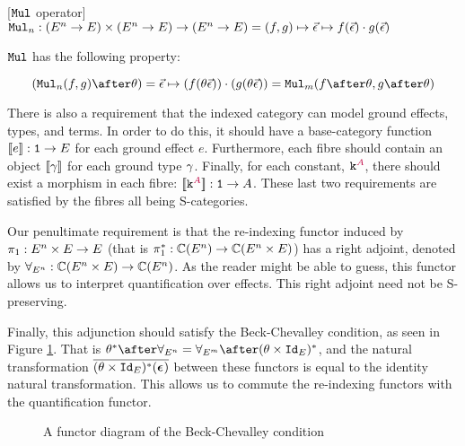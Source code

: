 \documentclass{Report}
\begin{document}
\begin{framed}
    \begin{definition}\label{MulDef}
        [$\texttt{Mul}$ operator]
        $\texttt{Mul}_n: (E^n \rightarrow E)\times (E^n \rightarrow E) \rightarrow (E^n \rightarrow E) = (f, g)\mapsto \vec{\epsilon}\mapsto f(\vec{\epsilon})\cdot g(\vec{\epsilon})$
    \end{definition}
    
    \begin{definition}[Naturality]\label{MulNaturality}
        $\texttt{Mul}$ has the following property:

        \begin{equation*}
            (\Mul_n(f, g)\after \theta) = \ev\mapsto(f(\theta \ev))\dot(g(\theta\ev)) = \Mul_m(f\after\theta, g\after\theta)
        \end{equation*}
    \end{definition}
\end{framed}

There is also a requirement that the indexed category can model ground effects, types, and terms. In order to do this, it should have a base-category function ${\bf [\![}e{\bf ]\!]}: \texttt{1}\rightarrow E$ for each ground effect $e$. Furthermore, each fibre should contain an object ${\bf [\![}\gamma{\bf ]\!]}$ for each ground type $\gamma$. Finally, for each constant, $\texttt{k}^{\color{purple} A}$, there should exist a morphism in each fibre: ${\bf [\![}\texttt{k}^{\color{purple} A}{\bf ]\!]}: \texttt{1} \rightarrow A$. These last two requirements are satisfied by the fibres all being S-categories.

Our penultimate requirement is that the re-indexing functor induced by $\pi_1: E^n\times E\rightarrow E$ (that is $\pi_1^*: \mathbb{C}(E^n) \rightarrow \mathbb{C}(E^n\times E)$) has a right adjoint, denoted by $\forall_{E^n}: \mathbb{C}(E^n\times E) \rightarrow \mathbb{C}(E^n)$. As the reader might be able to guess, this functor allows us to interpret quantification over effects. This right adjoint need not be S-preserving.

Finally, this adjunction should satisfy the Beck-Chevalley condition, as seen in Figure \ref{BeckChevalleyDiagram}. That is $\theta\star\after\allEn = \allEm\after(\theta\times\Id{E})\star$, and the natural transformation $\overline{(\theta\times\texttt{Id}_{E})^*(\boldsymbol{\epsilon}_{})}$ between these functors is equal to the identity natural transformation. This allows us to commute the re-indexing functors with the quantification functor.

\begin{figure}
    \begin{framed}
        \centering
    \end{framed}
    \caption{A functor diagram of the Beck-Chevalley condition}
    \label{BeckChevalleyDiagram}
\end{figure}
\end{document}
